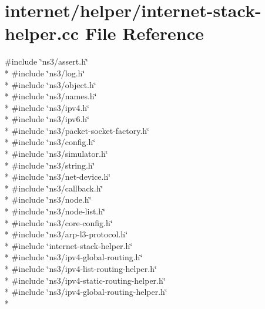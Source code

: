 \hypertarget{internet-stack-helper_8cc}{}\section{internet/helper/internet-\/stack-\/helper.cc File Reference}
\label{internet-stack-helper_8cc}
{\ttfamily \#include \char`\"{}ns3/assert.\+h\char`\"{}}\\*
{\ttfamily \#include \char`\"{}ns3/log.\+h\char`\"{}}\\*
{\ttfamily \#include \char`\"{}ns3/object.\+h\char`\"{}}\\*
{\ttfamily \#include \char`\"{}ns3/names.\+h\char`\"{}}\\*
{\ttfamily \#include \char`\"{}ns3/ipv4.\+h\char`\"{}}\\*
{\ttfamily \#include \char`\"{}ns3/ipv6.\+h\char`\"{}}\\*
{\ttfamily \#include \char`\"{}ns3/packet-\/socket-\/factory.\+h\char`\"{}}\\*
{\ttfamily \#include \char`\"{}ns3/config.\+h\char`\"{}}\\*
{\ttfamily \#include \char`\"{}ns3/simulator.\+h\char`\"{}}\\*
{\ttfamily \#include \char`\"{}ns3/string.\+h\char`\"{}}\\*
{\ttfamily \#include \char`\"{}ns3/net-\/device.\+h\char`\"{}}\\*
{\ttfamily \#include \char`\"{}ns3/callback.\+h\char`\"{}}\\*
{\ttfamily \#include \char`\"{}ns3/node.\+h\char`\"{}}\\*
{\ttfamily \#include \char`\"{}ns3/node-\/list.\+h\char`\"{}}\\*
{\ttfamily \#include \char`\"{}ns3/core-\/config.\+h\char`\"{}}\\*
{\ttfamily \#include \char`\"{}ns3/arp-\/l3-\/protocol.\+h\char`\"{}}\\*
{\ttfamily \#include \char`\"{}internet-\/stack-\/helper.\+h\char`\"{}}\\*
{\ttfamily \#include \char`\"{}ns3/ipv4-\/global-\/routing.\+h\char`\"{}}\\*
{\ttfamily \#include \char`\"{}ns3/ipv4-\/list-\/routing-\/helper.\+h\char`\"{}}\\*
{\ttfamily \#include \char`\"{}ns3/ipv4-\/static-\/routing-\/helper.\+h\char`\"{}}\\*
{\ttfamily \#include \char`\"{}ns3/ipv4-\/global-\/routing-\/helper.\+h\char`\"{}}\\*
